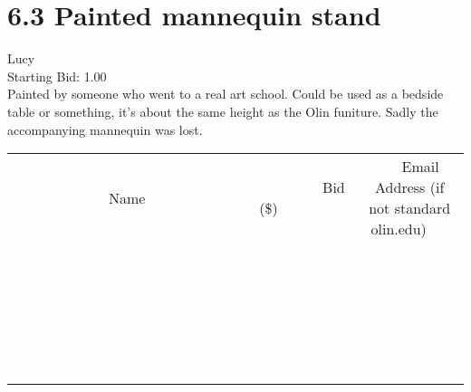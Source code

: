\documentclass[11pt]{article}
\begin{document}
					\section*{6.3 Painted mannequin stand}
					Lucy \\
					Starting Bid: 1.00 \\
					Painted by someone who went to a real art school. Could be used as a bedside table or something, it's about the same height as the Olin funiture. Sadly the accompanying mannequin was lost. \\
					[6ex]
					\begin{tabular}{c c c}
						~~~~~~~~~~~~~Name~~~~~~~~~~~~~ & ~~~~~~~~~Bid (\$)~~~~~~~~~ & ~~~Email Address (if not standard olin.edu)~~~ \\
				
 & & \\
\hline
 & & \\
\hline
 & & \\
\hline
 & & \\
\hline
 & & \\
\hline
 & & \\
\hline
 & & \\
\hline
 & & \\
\hline
 & & \\
\hline
 & & \\
\hline
 & & \\
\hline
 & & \\
\hline
 & & \\
\hline
 & & \\
\hline
 & & \\
\hline
 & & \\
\hline
 & & \\
\hline
 & & \\
\hline
 & & \\
\hline
 & & \\
\hline
 & & \\
\hline
 & & \\
\hline
 & & \\
\hline
 & & \\
\hline
 & & \\
\hline
 & & \\
\hline
					\end{tabular}
					\clearpage
				
\end{document}
